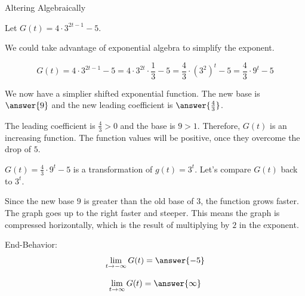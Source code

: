 \documentclass{ximera}
\begin{document}
\begin{example} Altering Algebraically



Let $G(t) = 4 \cdot 3^{2t-1} - 5$.  

We could take advantage of exponential algebra to simplify the exponent.   

\[ 
G(t) = 4 \cdot 3^{2t-1} - 5 = 4 \cdot 3^{2t} \cdot \frac{1}{3} - 5 = \frac{4}{3} \cdot (3^2)^t - 5  = \frac{4}{3} \cdot 9^t - 5
\]


We now have a simplier shifted exponential function.  The new base is $\answer{9}$ and the new leading coefficient is $\answer{\frac{4}{3}}$.




The leading coefficient is $\frac{4}{3} > 0$ and the base is $9 > 1$. Therefore, $G(t)$ is an increasing function.  The function values will be positive, once they overcome the drop of $5$.



$G(t) = \frac{4}{3} \cdot 9^t - 5$ is a transformation of $g(t) = 3^t$.  Let's compare $G(t)$ back to $3^t$.


Since the new base $9$ is greater than the old base of $3$, the function grows faster.  The graph goes up to the right faster and steeper.  This means the graph is compressed horizontally, which is the result of multiplying by $2$ in the exponent.





End-Behavior:
\[
\lim\limits_{t \to -\infty}G(t) = \answer{-5}  
\]

\[
\lim\limits_{t \to \infty}G(t) = \answer{\infty}
\]




\end{example}
\end{document}
